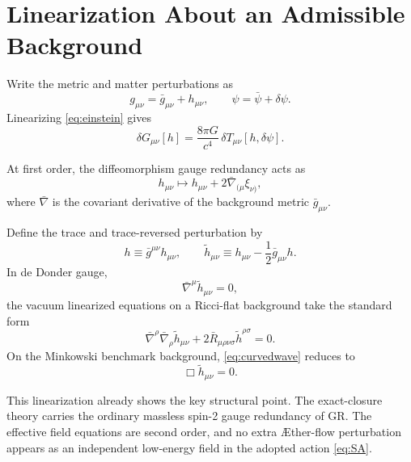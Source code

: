 \documentclass[11pt]{article}
\newcommand{\Aflow}{\AE{}ther-flow}
\begin{document}
\section{Linearization About an Admissible Background}

Write the metric and matter perturbations as
\begin{equation}
g_{\mu\nu}=\bar g_{\mu\nu}+h_{\mu\nu},
\qquad
\psi=\bar\psi+\delta\psi.
\label{eq:split}
\end{equation}
Linearizing \eqref{eq:einstein} gives
\begin{equation}
\delta G_{\mu\nu}[h]
=
\frac{8\pi G}{c^4}\,\delta T_{\mu\nu}[h,\delta\psi].
\label{eq:linearizedeinstein}
\end{equation}

At first order, the diffeomorphism gauge redundancy acts as
\begin{equation}
h_{\mu\nu}
\mapsto
h_{\mu\nu}+2\bar\nabla_{(\mu}\xi_{\nu)},
\label{eq:gaugetransform}
\end{equation}
where \(\bar\nabla\) is the covariant derivative of the background metric \(\bar g_{\mu\nu}\).

Define the trace and trace-reversed perturbation by
\begin{equation}
h\equiv \bar g^{\mu\nu}h_{\mu\nu},
\qquad
\widetilde h_{\mu\nu}
\equiv
h_{\mu\nu}-\frac{1}{2}\bar g_{\mu\nu}h.
\label{eq:tracereverse}
\end{equation}
In de Donder gauge,
\begin{equation}
\bar\nabla^\mu \widetilde h_{\mu\nu}=0,
\label{eq:dedonder}
\end{equation}
the vacuum linearized equations on a Ricci-flat background take the standard form
\begin{equation}
\bar\nabla^\rho\bar\nabla_\rho \widetilde h_{\mu\nu}
+
2\bar R_{\mu\rho\nu\sigma}\widetilde h^{\rho\sigma}
=
0.
\label{eq:curvedwave}
\end{equation}
On the Minkowski benchmark background, \eqref{eq:curvedwave} reduces to
\begin{equation}
\Box \widetilde h_{\mu\nu}=0.
\label{eq:minkwave}
\end{equation}

This linearization already shows the key structural point. The exact-closure theory carries the ordinary massless spin-2 gauge redundancy of GR. The effective field equations are second order, and no extra \Aflow{} perturbation appears as an independent low-energy field in the adopted action \eqref{eq:SA}.
\end{document}
